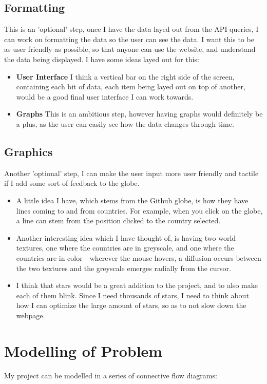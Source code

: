\subsection{Formatting}
This is an 'optional' step, once I have the data layed out from the API queries, I can work on formatting the data so the user can see the data. I want this to be as user friendly as possible, so that anyone can use the website, and understand the data being displayed. I have some ideas layed out for this:
\begin{itemize}
    \item \textbf{User Interface}
        I think a vertical bar on the right side of the screen, containing each bit of data, each item being layed out on top of another, would be a good final user interface I can work towards.
    \item \textbf{Graphs}
        This is an ambitious step, however having graphs would definitely be a plus, as the user can easily see how the data changes through time.
\end{itemize}

\subsection{Graphics}
Another 'optional' step, I can make the user input more user friendly and tactile if I add some sort of feedback to the globe.
\begin{itemize}
    \item A little idea I have, which stems from the Github globe, is how they have lines coming to and from countries. For example, when you click on the globe, a line can stem from the position clicked to the country selected.
    \item Another interesting idea which I have thought of, is having two world textures, one where the countries are in greyscale, and one where the countries are in color - wherever the mouse hovers, a diffusion occurs between the two textures and the greyscale emerges radially from the cursor.
    \item I think that stars would be a great addition to the project, and to also make each of them blink. Since I need thousands of stars, I need to think about how I can optimize the large amount of stars, so as to not slow down the webpage.
\end{itemize}
\newpage
\section{Modelling of Problem}
My project can be modelled in a series of connective flow diagrams:
